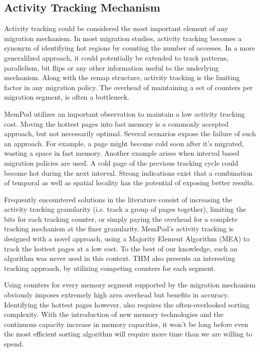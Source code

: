 \subsection{Activity Tracking Mechanism}
\label{sec:tracking}

Activity tracking could be considered the most important element of any migration mechanism. In most migration studies, activity tracking becomes a synonym of identifying hot regions by counting the number of accesses. In a more generalilzed approach, it could potentially be extended to track patterns, parallelism, bit flips or any other information useful to the underlying mechanism. Along with the remap structure, activity tracking is the limiting factor in any migration policy. The overhead of maintaining a set of counters per migration segment, is often a bottleneck. 

MemPod utilizes an important observation to maintain a low activity tracking cost. Moving the hottest pages into fast memory is a commonly accepted approach, but not necessarily optimal. Several scenarios expose the failure of such an approach. For example, a page might become cold soon after it's migrated, wasting a space in fast memory. Another example arises when interval based migration policies are used. A cold page of the previous tracking cycle could become hot during the next interval. Strong indications exist that a combination of temporal as well as spatial locality has the potential of exposing better results. 

Frequently encountered solutions in the literature consist of increasing the activity tracking granularity (i.e. track a group of pages together), limiting the bits for each tracking counter, or simply paying the overhead for a complete tracking mechanism at the finer granularity. MemPod's activity tracking  is designed with a novel approach, using a Majority Element Algorithm (MEA) to track the hottest pages at a low cost. To the best of our knowledge, such an algorithm was never used in this context. THM also presents an interesting tracking approach, by utilizing competing counters for each segment.

Using counters for every memory segment supported by the migration mechanism obviously imposes extremely high area overhead but benefits in accuracy. Identifying the hottest pages however, also requires the often-overlooked sorting complexity. With the introduction of new memory technologies and the continuous capacity increase in memory capacities, it won't be long before even the most efficient sorting algorithm will require more time than we are willing to spend.

